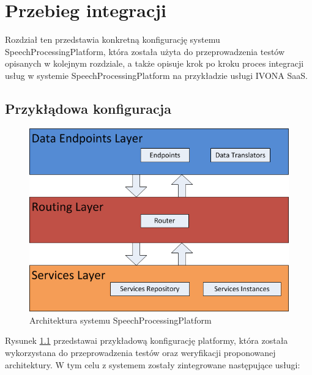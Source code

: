 

\chapter{Przebieg integracji} %



\ifpdf
    \graphicspath{{8/figures/PNG/}{8/figures/PDF/}{8/figures/}}
\else
    \graphicspath{{8/figures/EPS/}{8/figures/}}
\fi


Rozdział ten przedstawia konkretną konfigurację systemu SpeechProcessingPlatform, która została użyta do przeprowadzenia testów opisanych w kolejnym rozdziale, a także opisuje krok po kroku proces integracji usług w systemie SpeechProcessingPlatform na przykładzie usługi IVONA SaaS.
\section{Przykłądowa konfiguracja}

\begin{figure}[!h]
	\centering
	\includegraphics[scale=0.7]{layered_architecture.png}
	\caption{Architektura systemu SpeechProcessingPlatform}\label{fig:esb_configuration}
\end{figure}

Rysunek \ref{fig:esb_configuration} przedstawai przykładową konfigurację platformy, która została wykorzystana do przeprowadzenia testów oraz weryfikacji proponowanej architektury. W tym celu z systemem zostały zintegrowane następujące usługi:

